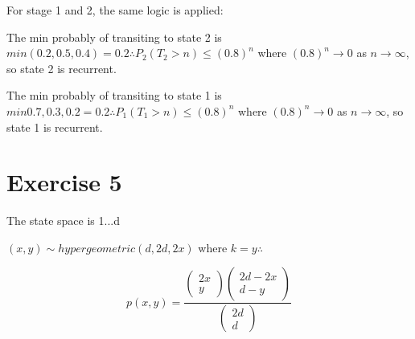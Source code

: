 \documentclass{article}\usepackage[]{graphicx}\usepackage[]{color}
\begin{document}
For stage 1 and 2, the same logic is applied:

The min probably of transiting to state 2 is $min(0.2, 0.5,0.4)=0.2\therefore P_{2}(T_{2}>n)\leq (0.8)^{n}$ where
$(0.8)^{n} \rightarrow 0$ as $n \rightarrow \infty$, so state 2 is recurrent.

The min probably of transiting to state 1 is $min{0.7, 0.3,0.2}=0.2\therefore P_{1}(T_{1}>n)\leq (0.8)^{n}$ where
$(0.8)^{n} \rightarrow 0$ as $n \rightarrow \infty$, so state 1 is recurrent.

\section*{Exercise 5}
The state space is {1...d}

$(x,y)\sim hypergeometric(d, 2d, 2x)$ where $k = y \therefore$

\begin{equation}
p(x,y) = \frac{\left(\begin{array}{c}
2x\\
y
\end{array}\right)\left(\begin{array}{c}
2d-2x\\
d-y
\end{array}\right)}{\left(\begin{array}{c}
2d\\
d
\end{array}\right)}
\end{equation}
\end{document}
